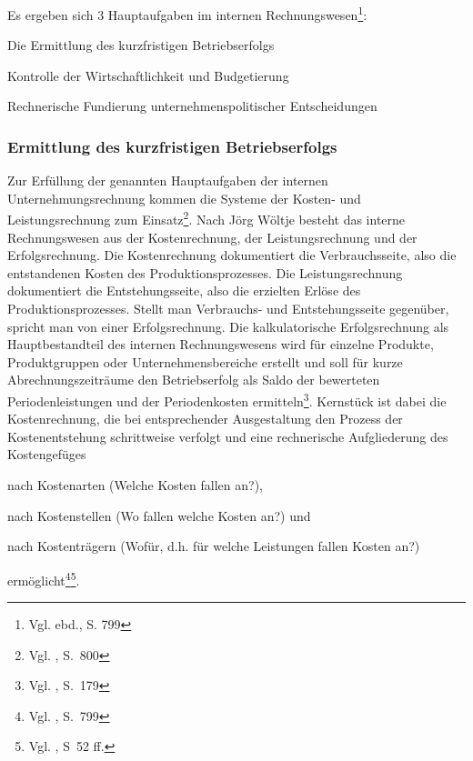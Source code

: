 \noindent Es ergeben sich 3 Hauptaufgaben im internen Rechnungswesen\footnote{Vgl. ebd., S. 799}:
\begin{compactitem}
\item[1] Die Ermittlung des kurzfristigen Betriebserfolgs
\item[2] Kontrolle der Wirtschaftlichkeit und Budgetierung
\item[3] Rechnerische Fundierung unternehmenspolitischer Entscheidungen
\end{compactitem}

\subsubsection{Ermittlung des kurzfristigen Betriebserfolgs}
Zur Erfüllung der genannten Hauptaufgaben der internen Unternehmungsrechnung kommen die Systeme der Kosten- und Leistungsrechnung zum Einsatz\footnote{Vgl. \cite{Schierenbeck2008}, S.~800}. Nach Jörg Wöltje besteht das interne Rechnungswesen aus der Kostenrechnung, der Leistungsrechnung und der Erfolgsrechnung. Die Kostenrechnung dokumentiert die Verbrauchsseite, also die entstandenen Kosten des Produktionsprozesses. Die Leistungsrechnung dokumentiert die Entstehungsseite, also die erzielten Erlöse des Produktionsprozesses. Stellt man Verbrauchs- und Entstehungsseite gegenüber, spricht man von einer Erfolgsrechnung. Die kalkulatorische Erfolgsrechnung als Hauptbestandteil des internen Rechnungswesens wird für einzelne Produkte, Produktgruppen oder Unternehmensbereiche erstellt und soll für kurze Abrechnungszeiträume den Betriebserfolg als Saldo der bewerteten Periodenleistungen und der Periodenkosten ermitteln\footnote{Vgl. \cite{Woltje2008}, S.~179}.
Kernstück ist dabei die Kostenrechnung, die bei entsprechender Ausgestaltung den Prozess der Kostenentstehung schrittweise verfolgt und eine rechnerische Aufgliederung des Kostengefüges 
\begin{compactitem}
\item nach Kostenarten (Welche Kosten fallen an?), 
\item nach Kostenstellen (Wo fallen welche Kosten an?) und 
\item nach Kostenträgern (Wofür, d.h. für welche Leistungen fallen Kosten an?)
\end{compactitem} ermöglicht\footnote{Vgl. \cite{Schierenbeck2008}, S.~799}\footnote{Vgl. \cite{Ossadnik2008}, S~52 ff.}.


